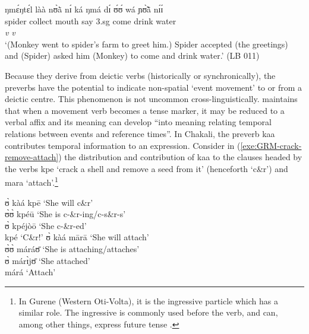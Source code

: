 \begin{exe}
\begin{exe}
\begin{exe}
{\begin{exe}
\begin{exe}
\begin{exe}
\begin{exe}
\begin{exe}
\begin{exe}
\begin{exe}
\begin{exe}
\begin{exe}
\begin{exe}
\begin{exe}
\begin{exe}
\begin{exe}
\begin{exe}
\begin{exe}
\begin{exe}
\begin{exe}
\begin{exe}
\begin{exe}
\ex\label{GRM-prev-SVC-wa}
\glll ŋmɛ́ŋtɛ́l   làà nʊ̀ã̀  nɪ́ ká  ŋmá dɪ́ ʊ́ʊ́  wá  
ɲʊ̃̀ã̀ nɪ́ɪ́\\
spider collect mouth {\postp}  {\conn} say {\comp}  
{\sc 3.sg}  come   drink water\\
 {} {} {} {} {}  {} {} {} {\it v} {\it v} {}\\
\glt  `(Monkey went to spider's farm to greet him.)  Spider accepted
(the
greetings) and (Spider) asked him (Monkey) to come and drink water.'  (LB 011)

 
\z 
 \z


Because they derive from deictic verbs (historically or synchronically),  the
preverbs have the potential to indicate non-spatial  `event movement'  to or 
from a deictic centre.
This phenomenon is not uncommon cross-linguistically. \citet[62]{Nico07}
maintains  that when a movement verb becomes a tense marker, it may be reduced
to a verbal affix and its meaning can develop ``into meaning relating temporal
relations between events and reference times''. In Chakali, the  preverb {\sls 
kaa} contributes   temporal information to an expression. Consider in
(\ref{exe:GRM-crack-remove-attach}) the distribution and contribution of  {\sls 
kaa} to  the clauses headed by the verbs {\sls kpe} `crack a shell and remove a
seed from it' (henceforth `c\&r') and {\sls mara} `attach'.\footnote{In Gurene 
(Western Oti-Volta), it
is the ingressive particle which has a similar role. The ingressive  is 
commonly used before the verb, and can, among other things,  express future
tense \citep[see][59]{Daku07b}.}



\ea\label{exe:GRM-crack-remove-attach}

\ea

 ʊ̀ kàá kpē  {\rm  `She will c\&r'}\\
   ʊ̀ʊ̀ kpéū  {\rm  `She  is c-\&r-ing/c-s\&r-s'}\\
   ʊ̀ kpéjòō   {\rm `She   c-\&r-ed'}\\
   kpé    {\rm  `C\&r!'}
\ex
 ʊ̀ kàá mārā   {\rm   `She will attach'}\\
   ʊ̀ʊ̀ máráʊ̄  {\rm  `She  is attaching/attaches'}\\
  ʊ̀ márɪ̀jʊ̄ {\rm `She   attached'}\\
   márá  {\rm  `Attach'}

\z
\z


\end{exe}
\end{exe}
\end{exe}
\end{exe}
\end{exe}
\end{exe}
\end{exe}
\end{exe}
\end{exe}
\end{exe}
\end{exe}
\end{exe}
\end{exe}
\end{exe}
\end{exe}
\end{exe}
\end{exe}
\end{exe}
\end{exe}}
\end{exe}
\end{exe}
\end{exe}
